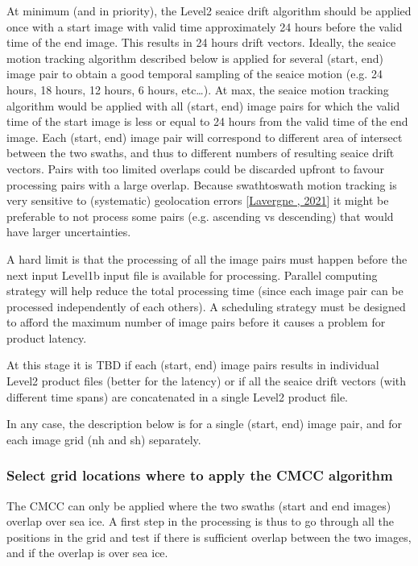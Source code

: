 \documentclass[letterpaper,10pt,english]{jupyterBook}
\begin{document}
\sphinxAtStartPar
At minimum (and in priority), the Level\sphinxhyphen{}2 sea\sphinxhyphen{}ice drift algorithm should be applied once with a start image with valid time approximately 24 hours before the valid time of the end image. This results in 24 hours drift vectors.
Ideally, the sea\sphinxhyphen{}ice motion tracking algorithm described below is applied for several (start, end) image pair to obtain a good temporal sampling of the sea\sphinxhyphen{}ice motion (e.g. 24 hours, 18 hours, 12 hours, 6 hours, etc…). At max,
the sea\sphinxhyphen{}ice motion tracking algorithm would be applied with all (start, end) image pairs for which the valid time of the start image is less or equal to 24 hours from the valid time of the end image. Each (start, end) image pair
will correspond to different area of intersect between the two swaths, and thus to different numbers of resulting sea\sphinxhyphen{}ice drift vectors. Pairs with too limited overlaps could be discarded up\sphinxhyphen{}front to favour processing pairs
with a large overlap. Because swath\sphinxhyphen{}to\sphinxhyphen{}swath motion tracking is very sensitive to (systematic) geolocation errors {[}\hyperlink{cite.references:id20}{Lavergne , 2021}{]} it might be preferable to not process some pairs (e.g. ascending vs descending) that
would have larger uncertainties.

\sphinxAtStartPar
A hard limit is that the processing of all the image pairs must happen before the next input Level\sphinxhyphen{}1b input file is available for processing. Parallel computing strategy will help reduce the
total processing time (since each image pair can be processed independently of each others). A scheduling strategy must be designed to afford the maximum number of image pairs before it causes a problem for product latency.

\sphinxAtStartPar
At this stage it is TBD if each (start, end) image pairs results in individual Level\sphinxhyphen{}2 product files (better for the latency) or if all the sea\sphinxhyphen{}ice drift vectors (with different time spans) are concatenated in a single
Level\sphinxhyphen{}2 product file.

\sphinxAtStartPar
In any case, the description below is for a single (start, end) image pair, and for each image grid (nh and sh) separately.


\subsubsection{Select grid locations where to apply the CMCC algorithm}
\label{\detokenize{baseline_algorithm_definition:select-grid-locations-where-to-apply-the-cmcc-algorithm}}
\sphinxAtStartPar
The CMCC can only be applied where the two swaths (start and end images) overlap over sea ice. A first step in the processing is thus to go through all the positions in the  grid and test if
there is sufficient overlap between the two images, and if the overlap is over sea ice.
\end{document}
